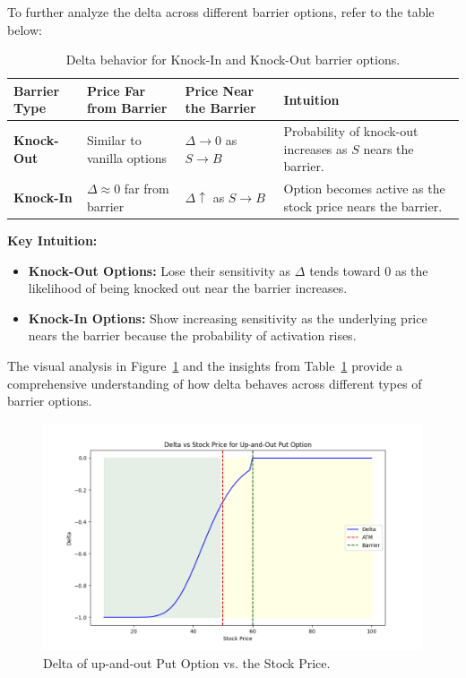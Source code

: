 To further analyze the delta across different barrier options, refer to the table below:


\begin{table}[htbp]
\centering
\begin{tabularx}{\textwidth}{|X|X|X|X|}
\hline
\textbf{Barrier Type}         & \textbf{Price Far from Barrier} & \textbf{Price Near the Barrier} & \textbf{Intuition}                              \\ 
\hline
\textbf{Knock-Out} & Similar to vanilla options     & $\Delta \to 0$ as $S \to B$  & Probability of knock-out increases as $S$ nears the barrier. \\ 
\hline
\textbf{Knock-In}    & $\Delta \approx 0$ far from barrier   & $\Delta \uparrow$ as $S \to B$  & Option becomes active as the stock price nears the barrier. \\ 
\hline
\end{tabularx}
\caption{Delta behavior for Knock-In and Knock-Out barrier options.}
\label{tab:delta_barrier_options}
\end{table}

\textbf{Key Intuition:}
\begin{itemize}
    \item \textbf{Knock-Out Options:} Lose their sensitivity as $\Delta$ tends toward $0$ as the likelihood of being knocked out near the barrier increases.
    \item \textbf{Knock-In Options:} Show increasing sensitivity as the underlying price nears the barrier because the probability of activation rises.
\end{itemize}

The visual analysis in Figure~\ref{fig:delta_upout} and the insights from Table~\ref{tab:delta_barrier_options} provide a comprehensive understanding of how delta behaves across different types of barrier options.
\begin{figure}[h]
    \centering
    \includegraphics[width=.65\linewidth]{content/images/delta.png}
    \caption{Delta of up-and-out Put Option vs. the Stock Price.}
    \label{fig:delta_upout}
\end{figure}

